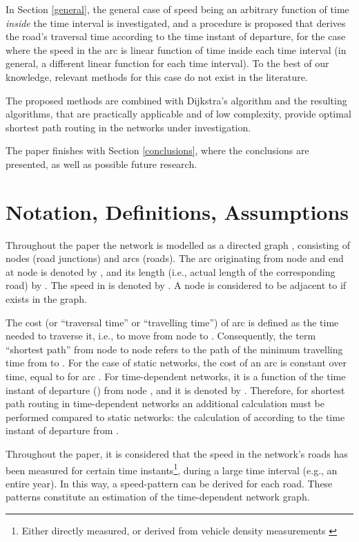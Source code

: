 \documentclass[conference]{IEEEtran}
\begin{document}
In Section \ref{general}, the general case of speed being an arbitrary function of time \emph{inside} the time interval is investigated, and a procedure is proposed that derives the road's traversal time according to the time instant of departure, for  the case where the speed in the arc is linear function of time inside each time interval (in general, a different linear function for each time interval). To the best of our knowledge, relevant methods for this case do not exist in the literature.  

The proposed methods are combined with Dijkstra's algorithm and the resulting algorithms, that are practically applicable and of low complexity, provide optimal shortest path routing in the networks under investigation.

The paper finishes with Section \ref{conclusions}, where the conclusions are presented, as well as possible future research.

\section{Notation, Definitions,  Assumptions} \label{def}

Throughout the paper the network is modelled as a directed graph , consisting of  nodes (road junctions) and  arcs (roads). The arc originating from node  and end at node  is denoted by ,  and its length (i.e., actual length of the corresponding road) by . The speed in  is denoted by . A node  is considered to be adjacent to  if  exists in the graph.

The cost  (or ``traversal time'' or ``travelling time'') of arc  is defined as the time needed to traverse it, i.e., to move from node  to . Consequently, the term ``shortest path'' from node  to node  refers to the path of the minimum travelling time from  to . For the case of static networks, the cost of an arc is constant over time, equal to  for arc . For time-dependent networks, it is a function of the time instant of departure () from node , and it is denoted by . Therefore, for shortest path routing in time-dependent networks an additional calculation must be performed compared to static networks: the calculation of  according to the time instant of departure from . 

Throughout the paper, it is considered that the speed in the network's roads has been measured for certain time instants\footnote{Either directly measured, or derived from vehicle density measurements \cite{may}}, during a large time interval (e.g., an entire year). In this way, a speed-pattern can be derived for each road. These patterns constitute an estimation of the time-dependent network graph.   
\end{document}
